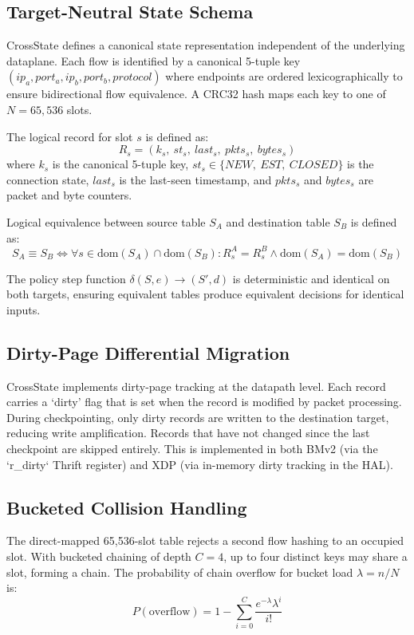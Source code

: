 \documentclass[10pt, conference]{IEEEtran}
\begin{document}
\subsection{Target-Neutral State Schema}
CrossState defines a canonical state representation independent of the underlying dataplane. Each flow is identified by a canonical 5-tuple key $(ip_a, port_a, ip_b, port_b, protocol)$ where endpoints are ordered lexicographically to ensure bidirectional flow equivalence. A CRC32 hash maps each key to one of $N = 65{,}536$ slots.

The logical record for slot $s$ is defined as:
\begin{equation}
    R_s = (k_s,\ st_s,\ last_s,\ pkts_s,\ bytes_s)
\label{eq:record}
\end{equation}
where $k_s$ is the canonical 5-tuple key, $st_s \in \{NEW,\ EST,\ CLOSED\}$ is the connection state, $last_s$ is the last-seen timestamp, and $pkts_s$ and $bytes_s$ are packet and byte counters.

Logical equivalence between source table $S_A$ and destination table $S_B$ is defined as:
\begin{equation}
    S_A \equiv S_B \iff \forall s \in \text{dom}(S_A) \cap \text{dom}(S_B):
    R_s^A = R_s^B \land \text{dom}(S_A) = \text{dom}(S_B)
\label{eq:equivalence}
\end{equation}

The policy step function $\delta(S,e)\rightarrow(S',d)$ is deterministic and identical on both targets, ensuring equivalent tables produce equivalent decisions for identical inputs.

\subsection{Dirty-Page Differential Migration}
\label{subsec:dirty_page}
CrossState implements dirty-page tracking at the datapath level. Each record carries a `dirty' flag that is set when the record is modified by packet processing. During checkpointing, only dirty records are written to the destination target, reducing write amplification. Records that have not changed since the last checkpoint are skipped entirely. This is implemented in both BMv2 (via the `r_dirty` Thrift register) and XDP (via in-memory dirty tracking in the HAL).

\subsection{Bucketed Collision Handling}
\label{subsec:bucketed_chains}
The direct-mapped 65{,}536-slot table rejects a second flow hashing to an occupied slot. With bucketed chaining of depth $C=4$, up to four distinct keys may share a slot, forming a chain. The probability of chain overflow for bucket load $\lambda = n/N$ is:
\begin{equation}
    P(\text{overflow}) = 1 - \sum_{i=0}^{C} \frac{e^{-\lambda}\lambda^i}{i!}
\label{eq:overflow}
\end{equation}
\end{document}
